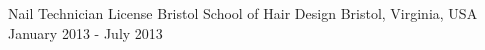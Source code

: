 

\begin{cventries}

  \cventry
    {Nail Technician License} %
    {Bristol School of Hair Design}
    {Bristol, Virginia, USA} %
    {January 2013 - July 2013} %
    {
    }

\end{cventries}
